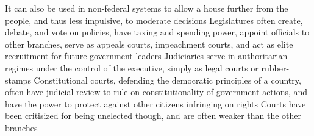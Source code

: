 \documentclass[11 pt, twoside]{article}
\newenvironment{outline*}
{
	\begin{outline}[enumerate]
	}
	{\end{outline}
}
\begin{document}
\begin{outline*}
\3 It can also be used in non-federal systems to allow a house further from the people, and thus less impulsive, to moderate decisions
\2 Legislatures often create, debate, and vote on policies, have taxing and spending power, appoint officials to other branches, serve as appeals courts, impeachment courts, and act as elite recruitment for future government leaders
\1 Judiciaries serve in authoritarian regimes under the control of the executive, simply as legal courts or rubber-stamps
\2 Constitutional courts, defending the democratic principles of a country, often have judicial review to rule on constitutionality of government actions, and have the power to protect against other citizens infringing on rights
\2 Courts have been critisized for being unelected though, and are often weaker than the other branches 
\end{outline*}
\end{document}
